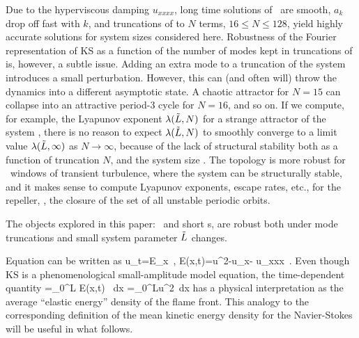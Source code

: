 Due to the hyperviscous damping
$u_{xxxx}$, long time solutions of \KSe\ are smooth,
$a_k$ drop off fast with $k$, and truncations
of  to $N$ terms, $16 \leq N \leq 128$, yield
highly accurate solutions for system sizes considered here.
Robustness of the Fourier representation of KS as
a function of the number of modes kept in truncations 
of  is, however, a subtle issue.
Adding an extra mode to a truncation of the system 
introduces a small
perturbation. However, this can (and often will) 
throw the dynamics into a different asymptotic state. 
A  chaotic attractor for $N=15$ can collapse into
an attractive period-3 
cycle for $N=16$, and so on. 
If we compute, for example, the Lyapunov exponent
$\lambda(\tilde{L},N)$ for a strange attractor of the 
system , there is no reason to 
expect $\lambda(\tilde{L},N)$ to smoothly converge to a limit  
value $\lambda(\tilde{L},\infty)$ as $N \rightarrow \infty$,
because of the lack of structural stability both
as a function of truncation $N$, and the system size \tildeL.
The topology is more robust for \tildeL\ windows of transient turbulence, 
where the system can be structurally stable, 
and it makes sense to compute 
 Lyapunov exponents, escape rates, etc., for the 
{repeller}, \ie, the closure of the set of all 
{unstable} periodic orbits. 

The objects explored in this paper: \eqva\ and short \po s,
are robust both under mode truncations and small 
system parameter $\tilde{L}$ changes.


Equation  can be written as %
\beq
    u_t=E_x
		\,,\qquad
    E(x,t)=u^2-u_{x}- u_{xxx}
    \,.
Even though KS is a phenomenological
small-amplitude model equation, the time-dependent quantity
\beq
    \expctE=\int_0^{L} E(x,t) \, dx
    =\int_0^{L}u^2\, dx
\label{ksEnergy}
\eeq
{}
has a physical interpretation
as the average ``elastic energy'' density of the flame front.
This analogy to the corresponding definition of the
mean kinetic energy density for
the Navier-Stokes will be useful in what follows.

